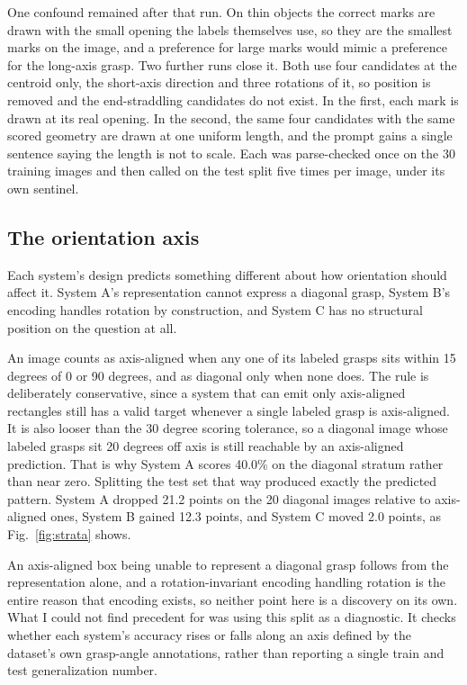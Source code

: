 \documentclass[12pt,letterpaper]{article}
\begin{document}
One confound remained after that run. On thin objects the correct
marks are drawn with the small opening the labels themselves use, so
they are the smallest marks on the image, and a preference for large
marks would mimic a preference for the long-axis grasp. Two further
runs close it. Both use four candidates at the centroid only, the
short-axis direction and three rotations of it, so position is removed
and the end-straddling candidates do not exist. In the first, each mark
is drawn at its real opening. In the second, the same four candidates
with the same scored geometry are drawn at one uniform length, and the
prompt gains a single sentence saying the length is not to scale. Each
was parse-checked once on the 30 training images and then called on
the test split five times per image, under its own sentinel.

\subsection{The orientation axis}

Each system's design predicts something different about how orientation
should affect it. System A's representation cannot express a diagonal
grasp, System B's encoding handles rotation by construction, and System
C has no structural position on the question at all.

An image counts as axis-aligned when any one of its labeled grasps sits
within 15 degrees of 0 or 90 degrees, and as diagonal only when none
does. The rule is deliberately conservative, since a system that can
emit only axis-aligned rectangles still has a valid target whenever a
single labeled grasp is axis-aligned. It is also looser than the 30
degree scoring tolerance, so a diagonal image whose labeled grasps sit
20 degrees off axis is still reachable by an axis-aligned prediction.
That is why System A scores 40.0\% on the diagonal stratum rather than
near zero. Splitting the test set that way
produced exactly the predicted pattern. System A dropped 21.2 points on
the 20 diagonal images relative to axis-aligned ones, System B gained
12.3 points, and System C moved 2.0 points, as Fig.~\ref{fig:strata}
shows.

An axis-aligned box being unable to represent a diagonal grasp follows
from the representation alone, and a rotation-invariant encoding
handling rotation is the entire reason that encoding exists, so neither
point here is a discovery on its own. What I could not find precedent
for was using this split as a diagnostic. It checks whether each
system's accuracy rises or falls along an axis defined by the dataset's
own grasp-angle annotations, rather than reporting a single train and
test generalization number.
\end{document}
